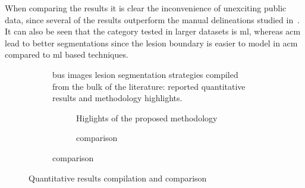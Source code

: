 When comparing the results it is clear the inconvenience of unexciting public data, since several of the results outperform the manual delineations studied in~\cite{gerard2013}.
It can also be seen that the category tested in larger datasets is \ac{ml}, whereas \ac{acm} lead to better segmentations since the lesion boundary is easier to model in \ac{acm} compared to \ac{ml} based techniques.

\begin{figure}[h]
  \begin{subfigure}[b]{\textwidth}
    {\tiny }
    \caption{\ac{bus} images lesion segmentation strategies compiled from the bulk of the literature: reported quantitative results and methodology highlights.}
    \label{fig:surveyResults:survey}
  \end{subfigure}
  \begin{subfigure}[b]{\textwidth}
    \centering
    \begin{subfigure}[b]{0.45\textwidth}
      
      \caption{Higlights of the proposed methodology}
      \label{fig:surveyResults:method}
    \end{subfigure}
    \begin{subfigure}[b]{0.45\textwidth}
      {\tiny  }
      \caption{{\small comparison}}
      \label{fig:surveyResults:comparison}
    \end{subfigure}
  \end{subfigure}
  \hfill
  \caption{Quantitative results compilation and comparison}
  \label{fig:surveyResults}
\end{figure}


